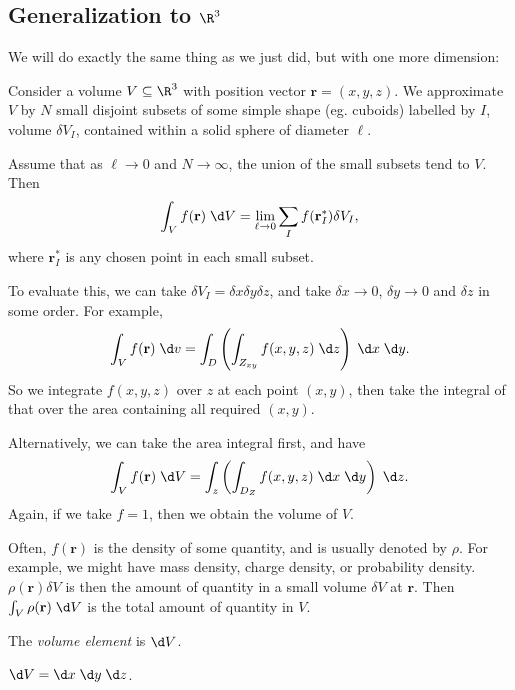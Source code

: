 \documentclass[a4paper]{article}
\begin{document}
\subsection{Generalization to \texorpdfstring{$\R^3$}{R3}}
We will do exactly the same thing as we just did, but with one more dimension:
\begin{defi}
  Consider a volume $V\subseteq \R^3$ with position vector $\mathbf{r} = (x, y, z)$. We approximate $V$ by $N$ small disjoint subsets of some simple shape (eg. cuboids) labelled by $I$, volume $\delta V_I$, contained within a solid sphere of diameter $\ell$.

  Assume that as $\ell \to 0$ and $N\to \infty$, the union of the small subsets tend to $V$. Then
  \[
    \int_V f(\mathbf{r})\;\d V = \lim_{\ell \to 0} \sum_{I}f(\mathbf{r}_I^*) \delta V_I,
  \]
  where $\mathbf{r}_I^*$ is any chosen point in each small subset.
\end{defi}
To evaluate this, we can take $\delta V_I = \delta x \delta y \delta z$, and take $\delta x\to 0$, $\delta y\to 0$ and $\delta z$ in some order. For example,
\[
  \int_V f(\mathbf{r})\;\d v = \int_D \left(\int_{Z_{xy}}f(x, y, z)\;\d z\right)\;\d x\;\d y.
\]
So we integrate $f(x, y, z)$ over $z$ at each point $(x, y)$, then take the integral of that over the area containing all required $(x, y)$.

Alternatively, we can take the area integral first, and have
\[
  \int_V f(\mathbf{r})\;\d V = \int_z\left(\int_{D_Z} f(x, y, z)\;\d x\;\d y\right)\;\d z.
\]
Again, if we take $f = 1$, then we obtain the volume of $V$.

Often, $f(\mathbf{r})$ is the density of some quantity, and is usually denoted by $\rho$. For example, we might have mass density, charge density, or probability density. $\rho(\mathbf{r})\delta V$ is then the amount of quantity in a small volume $\delta V$ at $\mathbf{r}$. Then $\int_V \rho(\mathbf{r}) \;\d V$ is the total amount of quantity in $V$.

\begin{defi}
  The \emph{volume element} is $\d V$.
\end{defi}

\begin{prop}
  $\d V = \d x\; \d y\; \d z$.
\end{prop}
\end{document}
